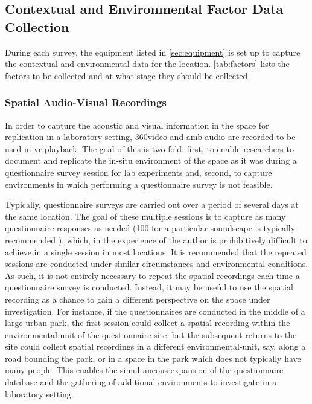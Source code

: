  \subsection{Contextual and Environmental Factor Data Collection}

   During each survey, the equipment listed in \cref{sec:equipment} is set up to capture the contextual and environmental data for the location. \cref{tab:factors} lists the factors to be collected and at what stage they should be collected.

   \subsubsection{Spatial Audio-Visual Recordings}

   In order to capture the acoustic and visual information in the space for replication in a laboratory setting, 360\degree video and \gls{amb} audio are recorded to be used in \gls{vr} playback. The goal of this is two-fold: first, to enable researchers to document and replicate the in-situ environment of the space as it was during a questionnaire survey session for lab experiments and, second, to capture environments in which performing a questionnaire survey is not feasible.

   Typically, questionnaire surveys are carried out over a period of several days at the same location. The goal of these multiple sessions is to capture as many questionnaire responses as needed (100 for a particular soundscape is typically recommended \citep{Engel2018Review}), which, in the experience of the author is prohibitively difficult to achieve in a single session in most locations. It is recommended that the repeated sessions are conducted under similar circumstances and environmental conditions. As such, it is not entirely necessary to repeat the spatial recordings each time a questionnaire survey is conducted. Instead, it may be useful to use the spatial recording as a chance to gain a different perspective on the space under investigation. For instance, if the questionnaires are conducted in the middle of a large urban park, the first session could collect a spatial recording within the \gls{environmental-unit} of the questionnaire site, but the subsequent returns to the site could collect spatial recordings in a different \gls{environmental-unit}, say, along a road bounding the park, or in a space in the park which does not typically have many people. This enables the simultaneous expansion of the questionnaire database and the gathering of additional environments to investigate in a laboratory setting.

